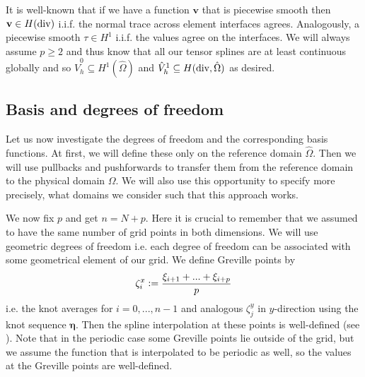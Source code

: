 \documentclass[../master_thesis.tex]{subfiles}
\begin{document}
It is well-known that if we have a function $\mathbf{v}$ that is piecewise smooth 
then $\mathbf{v} \in H(\operatorname{div})$ i.i.f. the normal trace across element interfaces
agrees. Analogously, a piecewise smooth $\tau \in H^1$ i.i.f. the values agree 
on the interfaces. We will always assume $p \geq 2$ and thus know that 
all our tensor splines are at least continuous globally and so
$\hat{V}_h^0 \subseteq H^1(\hat{\Omega})$ and $\hat{V}_h^1 \subseteq H(\operatorname{div},\hat{\Omega})$ as desired. 



\subsection{Basis and degrees of freedom}\label{sec:basis_and_degrees_of_freedom}

Let us now investigate the degrees of freedom and the corresponding basis functions. 
At first, we will define these only on the 
reference domain $\hat{\Omega}$. Then we will use
pullbacks and pushforwards to transfer them
from the reference domain to the physical domain $\Omega$. 
We will also use this opportunity to specify more precisely, what domains we consider 
such that this approach works.

We now fix $p$ and get $n = N+p$. Here it is crucial to remember that we assumed to 
have the same number of grid points in both dimensions.
We will use geometric degrees of 
freedom i.e. each degree of freedom can be associated with some geometrical element of our 
grid. We define Greville points by 
\begin{align*}
    \zeta_i^x \vcentcolon= \frac{\xi_{i+1} + ... + \xi_{i+p}}{p}
\end{align*}
i.e. the knot averages for $i=0,...,n-1$ and analogous $\zeta_j^y$ in $y$-direction 
using the knot sequence $\bm{\eta}$. 
Then the spline interpolation at these 
points is well-defined (see \cite[Sec.\,3.3.1]{isogeometric_analysis}).
Note that in the periodic case some Greville points lie outside of 
the grid, but we assume the function that is interpolated to be periodic as well, so
the values at the Greville points are well-defined.
\end{document}
